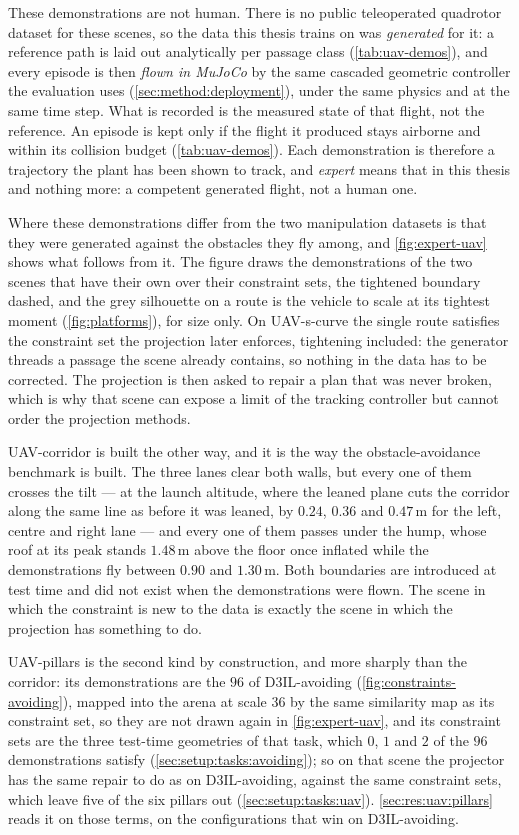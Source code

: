 These demonstrations are not human. There is no public teleoperated quadrotor dataset for these scenes,
so the data this thesis trains on was \emph{generated} for it: a reference path is laid out analytically
per passage class (\autoref{tab:uav-demos}), and every episode is then \emph{flown in MuJoCo} by the same
cascaded geometric controller the evaluation uses (\autoref{sec:method:deployment}), under the same
physics and at the same time step. What is recorded is the measured state of that flight, not the
reference. An episode is kept only if the flight it produced stays airborne and within its collision
budget (\autoref{tab:uav-demos}). Each
demonstration is therefore a trajectory the plant has been shown to track, and \emph{expert} means that
in this thesis and nothing more: a competent generated flight, not a human one.

Where these demonstrations differ from the two manipulation datasets is that they were generated against
the obstacles they fly among, and \autoref{fig:expert-uav} shows what follows from it. The figure draws
the demonstrations of the two scenes that have their own over their constraint sets, the tightened boundary dashed, and the grey silhouette
on a route is the vehicle to scale at its tightest moment (\autoref{fig:platforms}), for size only. On
UAV-s-curve the
single route satisfies the constraint set the projection later enforces, tightening included: the
generator threads a passage the scene already contains, so nothing in the data has to be corrected. The
projection is then asked to repair a plan that was never broken, which is why that scene can expose a
limit of the tracking controller but cannot order the projection methods.

UAV-corridor is built the other way, and it is the way the obstacle-avoidance benchmark is built. The three
lanes clear both walls, but every one of them crosses the tilt --- at the launch altitude, where the leaned
plane cuts the corridor along the same line as before it was leaned, by $0.24$, $0.36$ and $0.47$\,m for the
left, centre and right lane --- and every one of them passes under the hump, whose roof at its peak stands
$1.48$\,m above the floor once inflated while the demonstrations fly between $0.90$ and $1.30$\,m. Both
boundaries are introduced at test time and did not exist when the demonstrations were flown. The scene in
which the constraint is new to the data is exactly the scene in which the projection has something to do.


UAV-pillars is the second kind by construction, and more sharply than the corridor: its demonstrations are
the $96$ of D3IL-avoiding (\autoref{fig:constraints-avoiding}), mapped into the arena at scale $36$ by the
same similarity map as its constraint set, so they are not drawn again in \autoref{fig:expert-uav}, and
its constraint sets are the three test-time geometries of
that task, which $0$, $1$ and $2$ of the $96$ demonstrations satisfy (\autoref{sec:setup:tasks:avoiding});
so on that scene the projector has the same repair to do as on D3IL-avoiding, against the same constraint
sets, which leave five of the six pillars out (\autoref{sec:setup:tasks:uav}).
\autoref{sec:res:uav:pillars} reads it on those terms, on the configurations that win on D3IL-avoiding.

